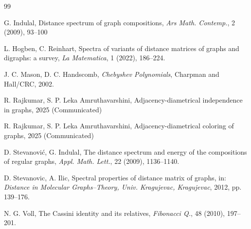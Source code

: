 \documentclass[12pt]{article}
\numberwithin{equation}{section}
\begin{document}
\begin{thebibliography}{99}
%	
		
	
	
		
	
		 G. Indulal, Distance spectrum of graph compositions, \textit{Ars Math. Contemp.},  2 (2009), 93--100
		
		 L. Hogben, C. Reinhart, Spectra of variants of distance matrices of graphs and digraphs: a survey, \textit{La Matematica},  1 (2022), 186--224.
		
		
	 J. C. Mason, D. C. Handscomb, \textit{Chebyshev Polynomials}, Charpman and Hall/CRC, 2002.


	     R. Rajkumar, S. P. Leka Amruthavarshini, Adjacency-diametrical independence in graphs, 2025 (Communicated)
	
		 R. Rajkumar, S. P. Leka Amruthavarshini, Adjacency-diametrical coloring of graphs, 2025 (Communicated)
		
	
		 D. Stevanović, G. Indulal, The distance spectrum and energy of the compositions of regular graphs, \textit{Appl. Math. Lett.},  22 (2009), 1136--1140.
		
		 D. Stevanovic, A. Ilic, Spectral properties of distance matrix of graphs, in: \textit{Distance in Molecular Graphs–Theory, Univ. Kragujevac, Kragujevac}, 2012, pp. 139--176.
	
		 N. G. Voll, The Cassini identity and its relatives, \textit{Fibonacci Q.},  48 (2010), 197--201.

		
	\end{thebibliography}
	
\end{document}
